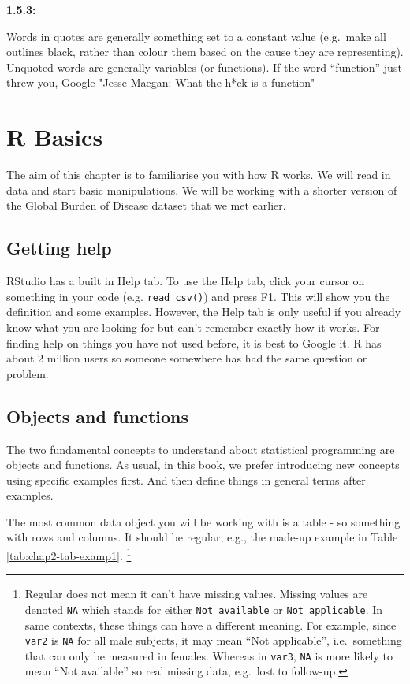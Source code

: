 \documentclass[12pt,]{krantz}
\theoremstyle{definition}
\theoremstyle{definition}
\theoremstyle{definition}
\theoremstyle{remark}
\begin{document}
\textbf{1.5.3:}

Words in quotes are generally something set to a constant value
(e.g.~make all outlines black, rather than colour them based on the
cause they are representing). Unquoted words are generally variables (or
functions). If the word ``function'' just threw you, Google "Jesse
Maegan: What the h*ck is a function"

\hypertarget{r-basics}{%
\chapter{R Basics}\label{r-basics}}

The aim of this chapter is to familiarise you with how R works. We will
read in data and start basic manipulations. We will be working with a
shorter version of the Global Burden of Disease dataset that we met
earlier.

\hypertarget{getting-help}{%
\section{Getting help}\label{getting-help}}

RStudio has a built in Help tab. To use the Help tab, click your cursor
on something in your code (e.g. \texttt{read\_csv()}) and press F1. This
will show you the definition and some examples. However, the Help tab is
only useful if you already know what you are looking for but can't
remember exactly how it works. For finding help on things you have not
used before, it is best to Google it. R has about 2 million users so
someone somewhere has had the same question or problem.

\hypertarget{objects-and-functions}{%
\section{Objects and functions}\label{objects-and-functions}}

The two fundamental concepts to understand about statistical programming
are objects and functions. As usual, in this book, we prefer introducing
new concepts using specific examples first. And then define things in
general terms after examples.

The most common data object you will be working with is a table - so
something with rows and columns. It should be regular, e.g., the made-up
example in Table \ref{tab:chap2-tab-examp1}. \footnote{Regular does not
  mean it can't have missing values. Missing values are denoted
  \texttt{NA} which stands for either \texttt{Not\ available} or
  \texttt{Not\ applicable}. In same contexts, these things can have a
  different meaning. For example, since \texttt{var2} is \texttt{NA} for
  all male subjects, it may mean ``Not applicable'', i.e.~something that
  can only be measured in females. Whereas in \texttt{var3}, \texttt{NA}
  is more likely to mean ``Not available'' so real missing data,
  e.g.~lost to follow-up.}
\end{document}
